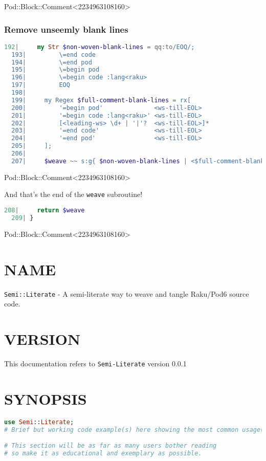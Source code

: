 \documentclass{scrartcl}
\begin{document}
Pod::Block::Comment<2234963108160>

\subsubsection{Remove unseemly blank lines}

\begin{lstlisting}[language=Raku]
  192|     my Str $non-woven-blank-lines = qq:to/EOQ/;
  193|         \=end code
  194|         \=end pod
  195|         \=begin pod
  196|         \=begin code :lang<raku>
  197|         EOQ
  198| 
  199|     my Regex $full-comment-blank-lines = rx[
  200|         '=begin pod'              <ws-till-EOL>
  201|         '=begin code :lang<raku>' <ws-till-EOL>
  202|         [<leading-ws> \d+ | '|'?  <ws-till-EOL>]*
  203|         '=end code'               <ws-till-EOL>
  204|         '=end pod'                <ws-till-EOL>
  205|     ];
  206| 
  207|     $weave ~~ s:g{ $non-woven-blank-lines | <$full-comment-blank-lines> } = '';

\end{lstlisting}


Pod::Block::Comment<2234963108160>

And that's the end of the \texttt{weave} subroutine!

\begin{lstlisting}[language=Raku]
  208|     return $weave
  209| } 

\end{lstlisting}


Pod::Block::Comment<2234963108160>

\section{NAME}

\texttt{Semi::Literate} - A semi-literate way to weave and tangle Raku/Pod6
source code.

\section{VERSION}

This documentation refers to \texttt{Semi-Literate} version 0.0.1

\section{SYNOPSIS}

\begin{lstlisting}[language=Raku]
use Semi::Literate;
# Brief but working code example(s) here showing the most common usage(s)

# This section will be as far as many users bother reading
# so make it as educational and exemplary as possible.


\end{lstlisting}
\end{document}
